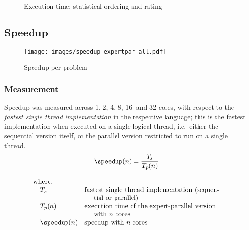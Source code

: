 \begin{figure}[htbp]
  \centering
  \vspace{-2ex}
  \caption{Execution time: statistical ordering and rating}
  \label{fig:ord:exectime}
\end{figure}

\subsection{Speedup}
\label{sec:speedup}

\begin{figure*}[htb]
  \centering
  \texttt{[image: images/speedup-expertpar-all.pdf]}
  \caption{Speedup per problem}
  \label{fig:speedup:problem}
\end{figure*}

\subsubsection{Measurement} Speedup was measured across 1, 2, 4, 8, 16, and 32 cores, with respect to the \emph{fastest single thread implementation} in the respective language; this is the fastest implementation when executed on a single logical thread, i.e.\ either the sequential version itself, or the parallel version restricted to run on a single thread. 
\begin{displaymath}
  \begin{array}{lp{7cm}}
  \multicolumn{2}{c}{\displaystyle
  \speedup(n) = \frac{T_s}{T_p(n)}} \\ \\
  \text{where:} \\
  \quad T_s         & \text{fastest single thread implementation (sequen-} \text{\ \ \ \ tial or parallel)} \\
  \quad T_p(n)      & \text{execution time of the expert-parallel version} \text{\ \ \ \ with $n$ cores} \\
  \quad \speedup(n) & \text{speedup with $n$ cores} \\
  \end{array}
\end{displaymath}


